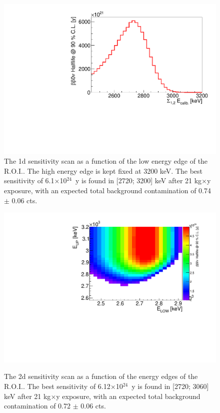 \documentclass[main.tex]{subfiles}
\begin{document}
\begin{figure}[h!]
\centering
\includegraphics[scale=0.60]{pictures/Chap4/Sens1D.pdf}
\caption{The 1d sensitivity scan as a function of the low energy edge of the R.O.I.. The high energy edge is kept fixed at 3200 keV. The best sensitivity of 6.1$\times$10$^{\text{24}}$~y is found in [2720; 3200] keV after 21 kg$\times$y exposure, with an
expected total background contamination of 0.74 $\pm$ 0.06 cts.}
\label{Sens0nu1D}
\end{figure}


\begin{figure}[h!]
\centering
\includegraphics[scale=0.65]{pictures/Chap4/sens2D.pdf}
\label{Sens0nu2D.png}
\caption{The 2d sensitivity scan as a function of the energy edges of the R.O.I.. The best sensitivity of 6.12$\times$10$^{\text{24}}$~y is found in [2720; 3060] keV after 21 kg$\times$y exposure, with an expected total background contamination of 0.72 $\pm$ 0.06 cts.}
\end{figure}
\end{document}
